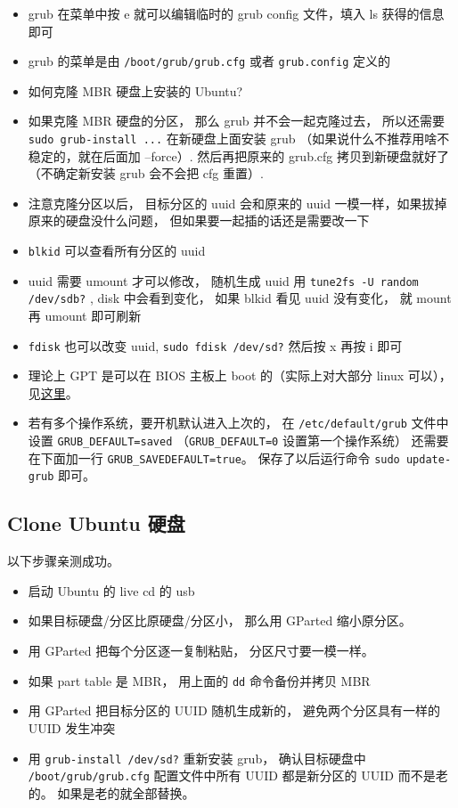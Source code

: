 \begin{itemize}
\item grub 在菜单中按 e 就可以编辑临时的 grub config 文件，填入 ls 获得的信息即可
\item grub 的菜单是由 \verb`/boot/grub/grub.cfg` 或者 \verb`grub.config` 定义的
\item 如何克隆 MBR 硬盘上安装的 Ubuntu?
\item 如果克隆 MBR 硬盘的分区， 那么 grub 并不会一起克隆过去， 所以还需要 \verb`sudo grub-install ...` 在新硬盘上面安装 grub （如果说什么不推荐用啥不稳定的，就在后面加 --force）. 然后再把原来的 grub.cfg 拷贝到新硬盘就好了（不确定新安装 grub 会不会把 cfg 重置）.
\item 注意克隆分区以后， 目标分区的 uuid 会和原来的 uuid 一模一样，如果拔掉原来的硬盘没什么问题， 但如果要一起插的话还是需要改一下
\item \verb`blkid` 可以查看所有分区的 uuid
\item uuid 需要 umount 才可以修改， 随机生成 uuid 用 \verb`tune2fs -U random /dev/sdb?` , disk 中会看到变化， 如果 blkid 看见 uuid 没有变化， 就 mount 再 umount 即可刷新
\item \verb`fdisk` 也可以改变 uuid, \verb`sudo fdisk /dev/sd?` 然后按 x 再按 i 即可
\item 理论上 GPT 是可以在 BIOS 主板上 boot 的（实际上对大部分 linux 可以）， 见\href{https://superuser.com/questions/1337344/is-it-possible-to-boot-linux-from-a-gpt-disk-on-a-bios-system}{这里}。
\item 若有多个操作系统，要开机默认进入上次的， 在 \verb`/etc/default/grub` 文件中设置 \verb`GRUB_DEFAULT=saved` （\verb`GRUB_DEFAULT=0` 设置第一个操作系统） 还需要在下面加一行 \verb`GRUB_SAVEDEFAULT=true`。 保存了以后运行命令 \verb`sudo update-grub` 即可。
\end{itemize}

\subsection{Clone Ubuntu 硬盘}
以下步骤亲测成功。
\begin{itemize}
\item 启动 Ubuntu 的 live cd 的 usb
\item 如果目标硬盘/分区比原硬盘/分区小， 那么用 GParted 缩小原分区。
\item 用 GParted 把每个分区逐一复制粘贴， 分区尺寸要一模一样。
\item 如果 part table 是 MBR， 用上面的 \verb`dd` 命令备份并拷贝 MBR
\item 用 GParted 把目标分区的 UUID 随机生成新的， 避免两个分区具有一样的 UUID 发生冲突
\item 用 \verb`grub-install /dev/sd?` 重新安装 grub， 确认目标硬盘中 \verb`/boot/grub/grub.cfg` 配置文件中所有 UUID 都是新分区的 UUID 而不是老的。 如果是老的就全部替换。
\end{itemize}


